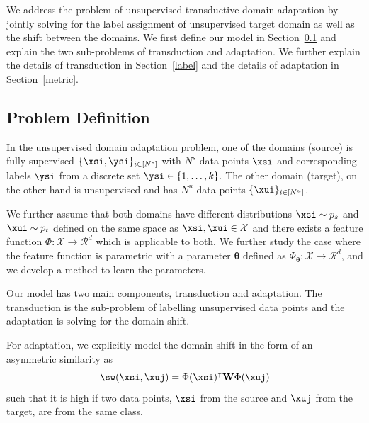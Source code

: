 We address the problem of unsupervised transductive domain adaptation by jointly solving for the label assignment of unsupervised target domain as well as the shift between the domains. We first define our model in Section~\ref{prob:def} and explain the two sub-problems of transduction and adaptation. We further explain the details of transduction in Section~\ref{label} and the details of adaptation in Section~\ref{metric}.

\subsection{Problem Definition}
\label{prob:def}
In the unsupervised domain adaptation problem, one of the domains (source) is fully supervised $\{\xsi, \ysi \}_{i \in [N^s]}$ with $N^s$ data points $\xsi$ and corresponding labels $\ysi$ from a discrete set $\ysi \in \{1,\ldots, k \}$.  The other domain (target), on the other hand is unsupervised and has $N^u$ data points $\{\xui \}_{i \in [N^u]}$. 

We further assume that both domains have different distributions $\xsi \sim p_s$ and $\xui \sim p_t$ defined on the same space as $\xsi,\xui \in \mathcal{X}$ and there exists a feature function \mbox{$\Phi:\mathcal{X}\rightarrow \mathcal{R}^d$} which is applicable to both. We further study the case where the feature function is parametric with a parameter $\mathbf{\theta}$ defined as \mbox{$\Phi_\mathbf{\theta}:\mathcal{X}\rightarrow \mathcal{R}^d$}, and we develop a method to learn the parameters.

Our model has two main components, transduction and adaptation. The transduction is the sub-problem of labelling unsupervised data points and the adaptation is solving for the domain shift. 

For adaptation, we explicitly model the domain shift in the form of an asymmetric similarity as
\begin{equation}
\sw(\xsi,\xuj) = \Phi(\xsi)^\intercal \mathbf{W} \Phi(\xuj)
\end{equation}
such that it is high if two data points, $\xsi$ from the source and $\xuj$ from the target, are from the same class.

